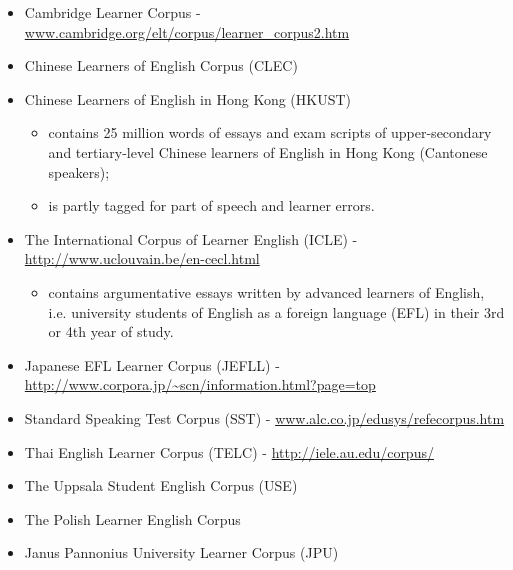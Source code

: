 \documentclass[12pt]{article}
\begin{document}
{\begin{itemize}[-]
\item Cambridge Learner Corpus -\url{www.cambridge.org/elt/corpus/learner_corpus2.htm}
\item Chinese Learners of English Corpus (CLEC)

\item Chinese Learners of English in Hong Kong (HKUST)
\begin{itemize}
\item contains 25 million words of essays and exam scripts of upper-secondary and tertiary-level Chinese learners of English in Hong Kong (Cantonese speakers);
\item is partly tagged for part of speech and learner errors.
\end{itemize}

\item The International Corpus of Learner English (ICLE) - \url{http://www.uclouvain.be/en-cecl.html}
\begin{itemize}
\item contains argumentative essays written by advanced learners of English, i.e. university students of English as a foreign language (EFL) in their 3rd or 4th year of study. 
\end{itemize}

\item Japanese EFL Learner Corpus (JEFLL) - \url{http://www.corpora.jp/~scn/information.html?page=top}
\item Standard Speaking Test Corpus (SST) - \url{www.alc.co.jp/edusys/refecorpus.htm}
\item Thai English Learner Corpus (TELC) - \url{http://iele.au.edu/corpus/}
\item The Uppsala Student English Corpus (USE)
\item The Polish Learner English Corpus 
\item Janus Pannonius University Learner Corpus (JPU)
\end{itemize}

}
\end{document}
